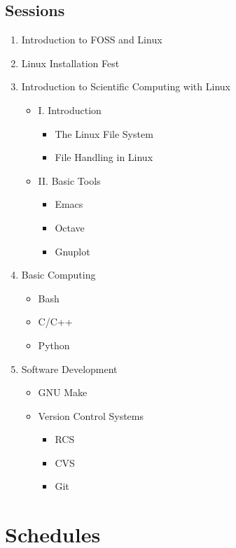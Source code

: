 \documentclass[11pt]{article}
\begin{document}
\subsection{Sessions}
\label{sec-2-1}
\begin{enumerate}
\item Introduction to FOSS and Linux
\item Linux Installation Fest
\item Introduction to Scientific Computing with Linux 
\begin{itemize}
\item I. Introduction   
\begin{itemize}
\item The Linux File System
\item File Handling in Linux
\end{itemize}
\item II. Basic Tools
\begin{itemize}
\item Emacs
\item Octave
\item Gnuplot
\end{itemize}
\end{itemize}
\item Basic Computing
\begin{itemize}
\item Bash
\item C/C++
\item Python
\end{itemize}
\item Software Development
\begin{itemize}
\item GNU Make
\item Version Control Systems
\begin{itemize}
\item RCS
\item CVS
\item Git
\end{itemize}
\end{itemize}
\end{enumerate}


\section{Schedules}
\label{sec-3}
\end{document}

